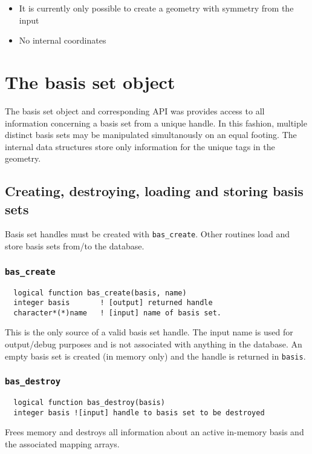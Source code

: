 \begin{itemize}
\item It is currently only possible to create a geometry with symmetry
  from the input
\item No internal coordinates
\end{itemize}


\section{The basis set object}


The basis set object and corresponding API was provides access to all
information concerning a basis set from a unique handle.  In this
fashion, multiple distinct basis sets may be manipulated simultanously
on an equal footing.  The internal data structures store only
information for the unique tags in the geometry.

\subsection{Creating, destroying, loading and storing basis sets}

Basis set handles must be created with \verb+bas_create+.  Other
routines load and store basis sets from/to the database.

\subsubsection{{\tt bas\_create}}
\begin{verbatim}
  logical function bas_create(basis, name)
  integer basis       ! [output] returned handle
  character*(*)name   ! [input] name of basis set.  
\end{verbatim}
This is the only source of a valid basis set handle.  The input name
is used for output/debug purposes and is not associated with anything
in the database.  An empty basis set is created (in memory only) and
the handle is returned in {\tt basis}.

\subsubsection{{\tt bas\_destroy}}
\begin{verbatim}
  logical function bas_destroy(basis)
  integer basis ![input] handle to basis set to be destroyed
\end{verbatim}
Frees memory and destroys all information about an active in-memory basis
and the associated mapping arrays.

